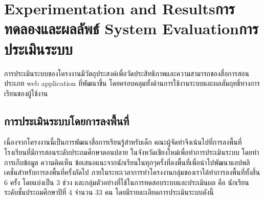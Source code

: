 \chapter{\ifproject%
\ifenglish Experimentation and Results\else การทดลองและผลลัพธ์\fi
\else%
\ifenglish System Evaluation\else การประเมินระบบ\fi
\fi}

การประเมินระบบของโครงงานมีวัตถุประสงค์เพื่อวัดประสิทธิภาพและความสามารถของสื่อการสอนประเภท web application ที่พัฒนาขึ้น โดยครอบคลุมทั้งด้านการใช้งานระบบและผลสัมฤทธิ์ทางการเรียนของผู้ใช้งาน 

\section{การประเมินระบบโดยการลงพื้นที่}
เนื่องจากโครงงานนี้เป็นการพัฒนาสื่อการเรียนรู้สำหรับเด็ก คณะผู้จัดทำจึงเน้นไปที่การลงพื้นที่ โรงเรียนที่มีการสอนระดับประถมศึกษาตอนปลาย ในจังหวัดเชียงใหม่เพื่อทำการประเมินระบบ
โดยทําการเก็บข้อมูล ความคิดเห็น ข้อเสนอแนะจากนักเรียนในทุกๆครั้งที่ลงพื้นที่เพื่อนําไปพัฒนาแอปพลิเคชั่นสําหรับการลงพื้นที่ครั้งถัดไป 
ภายในระยะเวลาการทําโครงงานกลุ่มของเราได้ทําการลงพื้นที่ทั้งสิ้น 6 ครั้ง โดยแบ่งเป็น 3 ช่วง และกลุ่มตัวอย่างที่ใช้ในการทดสอบระบบและประเมินผล คือ นักเรียนระดับชั้นประถมศึกษาปีที่ 4 จำนวน 33 คน
โดยมีรายละเอียดการประเมินระบบดังนี้
